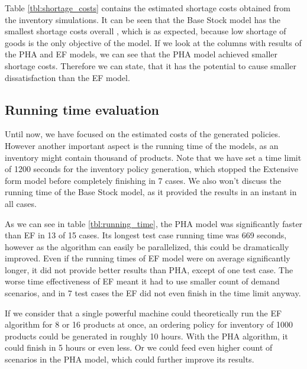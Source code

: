 \documentclass[11pt,a4paper]{article}
\begin{document}
Table \ref{tbl:shortage_costs} contains the estimated shortage costs obtained from the inventory simulations. It can be seen that the Base Stock model has the smallest shortage costs overall , which is as expected, because low shortage of goods is the only objective of the model. 
If we look at the columns with results of the PHA and EF models, we can see that the PHA model achieved smaller shortage costs. Therefore we can state, that it has the potential to cause smaller dissatisfaction than the EF model.

\newpage




\subsection{Running time evaluation}
Until now, we have focused on the estimated costs of the generated policies. However another important aspect is the running time of the models, as an inventory might contain thousand of products. Note that we have set a time limit of 1200 seconds for the inventory policy generation, which stopped the Extensive form model before completely finishing in 7 cases. We also won't discuss the running time of the Base Stock model, as it provided the results in an instant in all cases.

As we can see in table \ref{tbl:running_time}, the PHA model was significantly faster than EF in 13 of 15 cases. Its longest test case running time was 669 seconds, however as the algorithm can easily be parallelized, this could be dramatically improved. Even if the running times of EF model were on average significantly longer, it did not provide better results than PHA, except of one test case. The worse time effectiveness of EF meant it had to use smaller count of demand scenarios, and in 7 test cases the EF did not even finish in the time limit anyway.

If we consider that a single powerful machine could theoretically run the EF algorithm for 8 or 16 products at once, an ordering policy for inventory of 1000 products could be generated in roughly 10 hours. With the PHA algorithm, it could finish in 5 hours or even less. Or we could feed even higher count of scenarios in the PHA model, which could further improve its results.
\end{document}
